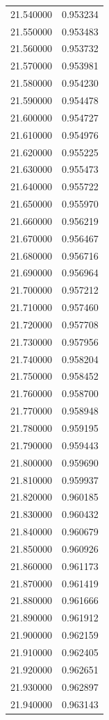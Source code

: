 \begin{tabular}{rr}
21.540000 & 0.953234 \\
21.550000 & 0.953483 \\
21.560000 & 0.953732 \\
21.570000 & 0.953981 \\
21.580000 & 0.954230 \\
21.590000 & 0.954478 \\
21.600000 & 0.954727 \\
21.610000 & 0.954976 \\
21.620000 & 0.955225 \\
21.630000 & 0.955473 \\
21.640000 & 0.955722 \\
21.650000 & 0.955970 \\
21.660000 & 0.956219 \\
21.670000 & 0.956467 \\
21.680000 & 0.956716 \\
21.690000 & 0.956964 \\
21.700000 & 0.957212 \\
21.710000 & 0.957460 \\
21.720000 & 0.957708 \\
21.730000 & 0.957956 \\
21.740000 & 0.958204 \\
21.750000 & 0.958452 \\
21.760000 & 0.958700 \\
21.770000 & 0.958948 \\
21.780000 & 0.959195 \\
21.790000 & 0.959443 \\
21.800000 & 0.959690 \\
21.810000 & 0.959937 \\
21.820000 & 0.960185 \\
21.830000 & 0.960432 \\
21.840000 & 0.960679 \\
21.850000 & 0.960926 \\
21.860000 & 0.961173 \\
21.870000 & 0.961419 \\
21.880000 & 0.961666 \\
21.890000 & 0.961912 \\
21.900000 & 0.962159 \\
21.910000 & 0.962405 \\
21.920000 & 0.962651 \\
21.930000 & 0.962897 \\
21.940000 & 0.963143 \\

\end{tabular}
